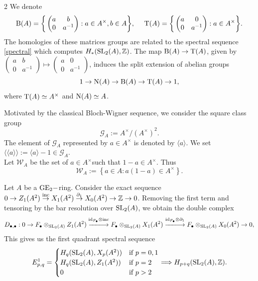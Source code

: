 \documentclass[a0]{sciposter}
\theoremstyle{definition}
\newcommand{\z}{\mathbb{Z}}
\newcommand{\GG}{\mathcal{G}}
\newcommand{\WW}{\mathcal{W}}
\renewcommand{\aa}{{A^\times}}
\newcommand{\arr}{\rightarrow}
\newcommand{\larr}{\longrightarrow}
\newcommand{\Bb}{{\rm B}}
\newcommand{\Tt}{{\rm T}}
\newcommand{\Nn}{{\rm N}}
\newcommand{\GE}{{\rm GE}}
\newcommand{\SL}{{\rm SL}}
\newcommand{\id}{{\rm id}}
\newcommand{\inc}{{\rm inc}}
\begin{document}
\begin{multicols}{2}
We denote 
\[
\Bb(A)=\bigg\{\begin{pmatrix}
a & b\\
0 & a^{-1}
\end{pmatrix}:a\in \aa, b\in A\bigg\},
\ \ \ \ 
\Tt(A)=\bigg\{\begin{pmatrix}
a & 0\\
0 & a^{-1}
\end{pmatrix}:a\in \aa\bigg\}.
\]
The homologies of these matrices groups are related to the spectral sequence \ref{spectral} which computes $H_*(\SL_2(A),\z)$. The map $\Bb(A) \arr \Tt(A)$, given by 
$\begin{pmatrix} a & b \\ 0 & a^{-1} \end{pmatrix} \mapsto \begin{pmatrix} a & 0 \\ 0 & a^{-1} \end{pmatrix}$,
induces the split extension of abelian groups
\begin{equation*}\label{s-e}
1 \arr \Nn(A) \arr \Bb(A) \arr \Tt(A) \arr 1,
\end{equation*}
where $\Tt(A)\simeq A^\times$ and $\Nn(A) \simeq A$.

Motivated by the classical Bloch-Wigner sequence, we consider the square class group
$$\GG_A:=\aa/(\aa)^2.$$
The element of $\GG_A$ represented by $a \in A^{\times}$ is denoted by $\langle a\rangle$. We set $\langle\langle a\rangle\rangle:=\langle a\rangle-1 \in \GG_A$.\\
Let $\WW_A$ be the set of $a \in A^{\times}$such that $1-a \in A^{\times}$. Thus
$$
\WW_A:=\left\{a \in A: a(1-a) \in A^{\times}\right\} .
$$

Let $A$ be a $\GE_2 -$ring. Consider the exact sequence $0 \arr Z_1(A^2) \overset{\inc}{\arr} X_1(A^2) \overset{\partial_1}{\arr} X_0(A^2) \arr \z \arr 0$. Removing the first term and tensoring by the bar resolution over $\SL_2(A)$, we obtain the double complex
\[
D_{\bullet,\bullet}: 0 \arr F_\bullet \otimes_{\SL_2(A)} Z_1(A^2) 
\overset{\id_{F_\bullet}\otimes\inc}{-\!\!\!-\!\!\!-\!\!\!\larr} 
F_\bullet \otimes_{\SL_2(A)}X_1(A^2)  \overset{\id_{F_\bullet}\otimes\partial_1}{-\!\!\!-\!\!\!-\!\!\!\larr} 
F_\bullet \otimes_{\SL_2(A)}X_0(A^2)  \arr 0,
\]
This gives us the first quadrant spectral sequence
\begin{equation}\label{spectral}
E^1_{p,q}=
\begin{cases}
H_q(\SL_2(A),X_p(A^2)) & \text{if } p=0,1\\
H_q(\SL_2(A),Z_1(A^2)) & \text{if } p=2\\
0 & \text{if } p>2
\end{cases}
\Longrightarrow H_{p+q}(\SL_2(A),\z).
\end{equation}



\end{multicols}
\end{document}
